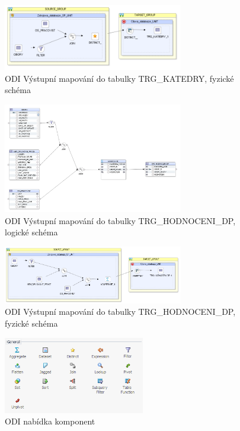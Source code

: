 \begin{figure}[htb]
    \centering
    \includegraphics[width=0.7\textwidth]{graphs/odi-mapping-trg-katedry-physical.png}
    \caption{ODI Výstupní mapování do tabulky TRG\_KATEDRY, fyzické schéma}
    \label{fig:odi-mapping-trg-katedry-physical}
\end{figure}
\FloatBarrier

\begin{figure}[htb]
    \centering
    \includegraphics[width=0.7\textwidth]{graphs/odi-mapping-trg-hodnoceni-dp.png}
    \caption{ODI Výstupní mapování do tabulky TRG\_HODNOCENI\_DP, logické schéma}
    \label{fig:odi-mapping-trg-hodnoceni}
\end{figure}
\FloatBarrier

\begin{figure}[htb]
    \centering
    \includegraphics[width=0.7\textwidth]{graphs/odi-mapping-trg-hodnoceni-dp-physical.png}
    \caption{ODI Výstupní mapování do tabulky TRG\_HODNOCENI\_DP, fyzické schéma}
    \label{fig:odi-mapping-trg-hodnoceni-physical}
\end{figure}
\FloatBarrier

\begin{figure}[htb]
    \centering
    \includegraphics[width=0.55\textwidth]{graphs/odi-transformation-components.png}
    \caption{ODI nabídka komponent}
    \label{fig:odi-transformation-components}
\end{figure}
\FloatBarrier


